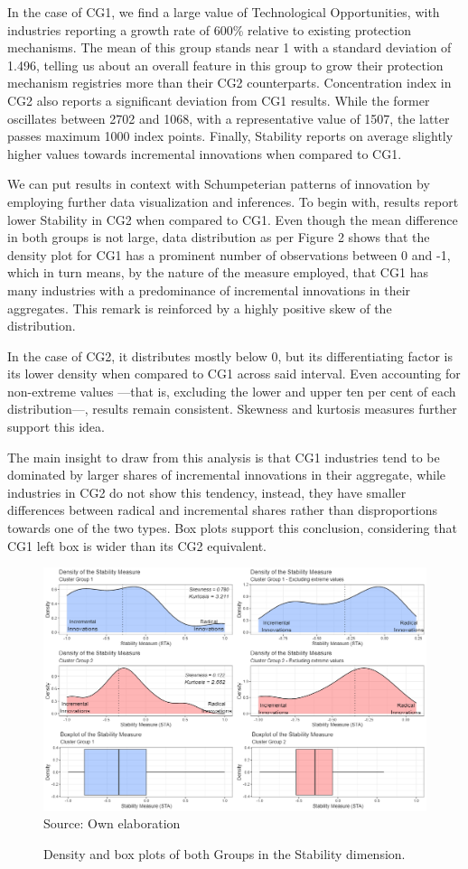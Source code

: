 \documentclass[12pt,a4paper]{article}
\begin{document}
In the case of CG1, we find a large value of Technological Opportunities, with industries reporting a growth rate of 600\% relative to existing protection mechanisms. The mean of this group stands near 1 with a standard deviation of 1.496, telling us about an overall feature in this group to grow their protection mechanism registries more than their CG2 counterparts. Concentration index in CG2 also reports a significant deviation from CG1 results. While the former oscillates between 2702 and 1068, with a representative value of 1507, the latter passes maximum 1000 index points. Finally, Stability reports on average slightly higher values towards incremental innovations when compared to CG1.  

We can put results in context with Schumpeterian patterns of innovation by employing further data visualization and inferences. To begin with, results report lower Stability in CG2 when compared to CG1. Even though the mean difference in both groups is not large, data distribution as per Figure 2 shows that the density plot for CG1 has a prominent number of observations between 0 and -1, which in turn means, by the nature of the measure employed, that CG1 has many industries with a predominance of incremental innovations in their aggregates. This remark is reinforced by a highly positive skew of the distribution. 

In the case of CG2, it distributes mostly below 0, but its differentiating factor is its lower density when compared to CG1 across said interval. Even accounting for non-extreme values —that is, excluding the lower and upper ten per cent of each distribution—, results remain consistent. Skewness and kurtosis measures further support this idea. 

The main insight to draw from this analysis is that CG1 industries tend to be dominated by larger shares of incremental innovations in their aggregate, while industries in CG2 do not show this tendency, instead, they have smaller differences between radical and incremental shares rather than disproportions towards one of the two types. Box plots support this conclusion, considering that CG1 left box is wider than its CG2 equivalent.

\begin{figure}[H]	
	\caption{Density and box plots of both Groups in the Stability dimension.}
	\centering
	\includegraphics[scale = 0.45]{sta.png}
		Source: Own elaboration
\end{figure}
\end{document}
